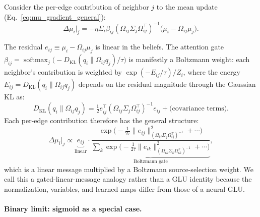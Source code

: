 \documentclass[twoside,11pt]{article}
\begin{document}
Consider the per-edge contribution of neighbor $j$ to the mean update (Eq.~\ref{eq:mu_gradient_general}):
%
\begin{equation}
\Delta\mu_i\big|_j = -\eta \Sigma_i \beta_{ij} (\Omega_{ij}\Sigma_j\Omega_{ij}^\top)^{-1}\bigl(\mu_i - \Omega_{ij}\mu_j\bigr).
\label{eq:glu_message}
\end{equation}
%

The residual $e_{ij} \equiv \mu_i - \Omega_{ij}\mu_j$ is linear in the beliefs. The attention gate $\beta_{ij} = \operatorname{softmax}_j \bigl(-D_{\mathrm{KL}}(q_i \| \Omega_{ij}q_j)/\tau\bigr)$ is manifestly a Boltzmann weight: each neighbor's contribution is weighted by $\exp(-E_{ij}/\tau)/Z_i$, where the energy $E_{ij} = D_{\mathrm{KL}}(q_i \| \Omega_{ij}q_j)$ depends on the residual magnitude through the Gaussian KL as:
%
\begin{equation}
D_{\mathrm{KL}}(q_i \| \Omega_{ij}q_j) = \tfrac{1}{2} e_{ij}^\top (\Omega_{ij}\Sigma_j\Omega_{ij}^\top)^{-1} e_{ij} + \text{(covariance terms)}.
\label{eq:dkl_quadratic}
\end{equation}
%
Each per-edge contribution therefore has the general structure:
%
\begin{equation}
\boxed{\Delta\mu_i\big|_j \propto \underbrace{e_{ij}}_{\text{linear}} \cdot \underbrace{\frac{\exp \bigl(-\tfrac{1}{2\tau}\|e_{ij}\|^2_{(\Omega_{ij}\Sigma_j\Omega_{ij}^\top)^{-1}} + \cdots\bigr)}{\sum_k \exp \bigl(-\tfrac{1}{2\tau}\|e_{ik}\|^2_{(\Omega_{ik}\Sigma_k\Omega_{ik}^\top)^{-1}} + \cdots\bigr)}}_{\text{Boltzmann gate}},}
\label{eq:vfe_glu}
\end{equation}
%
which is a linear message multiplied by a Boltzmann source-selection weight. We call this a gated-linear-message analogy rather than a GLU identity because the normalization, variables, and learned maps differ from those of a neural GLU.

\paragraph{Binary limit: sigmoid as a special case.}
\end{document}
